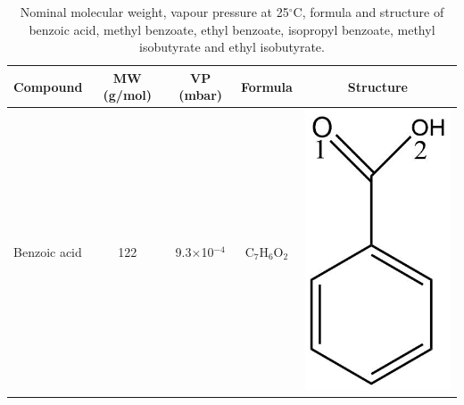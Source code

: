 \begin{table}
\centering
\caption{Nominal molecular weight, vapour pressure at 25$^\circ$C, formula and structure of benzoic acid, methyl benzoate, ethyl benzoate, isopropyl benzoate, methyl isobutyrate and ethyl isobutyrate.}
\begin{tabular}{lcccc}
\textbf{Compound} &  \textbf{MW (g/mol)} & \textbf{VP (mbar)} & \textbf{Formula} & \textbf{Structure} \\ 
\toprule
Benzoic acid &   122 &9.3$\times$10$^{-4}$&   C$_{7}$H$_{6}$O$_2$ & \begin{minipage}[c]{0.085\linewidth}\centering \includegraphics[width=\linewidth]{pics/cocaine-chapter/bzacid_struct.png}\end{minipage}\\ 

\end{tabular}
\end{table}
